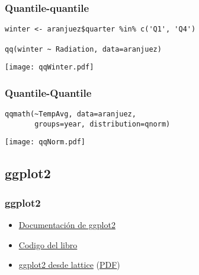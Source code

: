 \documentclass[xcolor={usenames,svgnames,dvipsnames}]{beamer}
\begin{document}
\begin{frame}[fragile]
\frametitle{Quantile-quantile}
\label{sec-2-1-25}


\lstset{language=R}
\begin{lstlisting}
winter <- aranjuez$quarter %in% c('Q1', 'Q4')

qq(winter ~ Radiation, data=aranjuez)
\end{lstlisting}

\texttt{[image: qqWinter.pdf]}
\end{frame}
\begin{frame}[fragile]
\frametitle{Quantile-Quantile}
\label{sec-2-1-26}


\lstset{language=R}
\begin{lstlisting}
qqmath(~TempAvg, data=aranjuez,
       groups=year, distribution=qnorm)
\end{lstlisting}

\texttt{[image: qqNorm.pdf]}
\end{frame}
\subsection{ggplot2}
\label{sec-2-2}
\begin{frame}
\frametitle{ggplot2}
\label{sec-2-2-1}

\begin{itemize}
\item \href{http://docs.ggplot2.org/current/}{Documentación de ggplot2}
\item \href{http://ggplot2.org/book/}{Codigo del libro}
\item \href{http://learnr.wordpress.com/2009/06/28/ggplot2-version-of-figures-in-lattice-multivariate-data-visualization-with-r-part-1/}{ggplot2 desde lattice} (\href{http://learnr.files.wordpress.com/2009/08/latbook.pdf}{PDF})
\end{itemize}
\end{frame}
\end{document}
